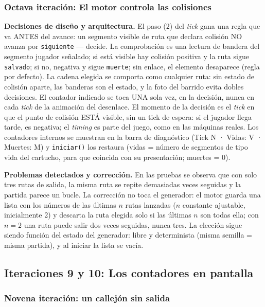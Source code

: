 \subsubsection{Octava iteración: El motor controla las colisiones}

\textbf{Decisiones de diseño y arquitectura.} El paso (2) del
\textit{tick} gana una regla que va ANTES del avance: un segmento
visible de ruta que declara colisión NO avanza por \texttt{siguiente} —
decide. La comprobación es una lectura de bandera del segmento jugador
señalado; si está visible hay colisión positiva y la ruta sigue
\texttt{salvado}; si no, negativa y sigue \texttt{muerte}; sin enlace,
el elemento desaparece (regla por defecto). La cadena elegida se
comporta como cualquier ruta: sin estado de colisión aparte, las
banderas son el estado, y la foto del barrido evita dobles decisiones.
El contador indicado se toca UNA sola vez, en la decisión, nunca en
cada \textit{tick} de la animación del desenlace. El momento de la
decisión es el \textit{tick} en que el punto de colisión ESTÁ visible,
sin un tick de espera: si el jugador llega tarde, es negativa; el
\emph{timing} es parte del juego, como en las máquinas reales. Los
contadores internos se muestran en la barra de diagnóstico
(Tick N · Vidas: V · Muertes: M) y \texttt{iniciar()} los restaura
(vidas = número de segmentos de tipo vida del cartucho, para que
coincida con su presentación; muertes = 0).

\textbf{Problemas detectados y corrección.} En las pruebas se observa
que con solo tres rutas de salida, la misma ruta se repite demasiadas
veces seguidas y la partida parece un bucle. La corrección no toca el
generador: el motor guarda una lista con los números de las últimas $n$
rutas lanzadas ($n$ constante ajustable, inicialmente 2) y descarta la
ruta elegida solo si las últimas $n$ son todas ella; con $n = 2$ una
ruta puede salir dos veces seguidas, nunca tres. La elección sigue
siendo función del estado del generador: libre y determinista (misma
semilla = misma partida), y al iniciar la lista se vacía.

\subsection{Iteraciones 9 y 10: Los contadores en pantalla}
\label{sec:F3Contadores}

\subsubsection{Novena iteración: un callejón sin salida}

